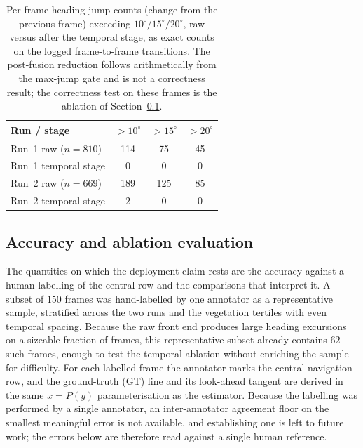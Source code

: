 {\renewcommand{\arraystretch}{1.2}
\begin{table}[!ht]
  \centering
  \caption{Per-frame heading-jump counts (change from the previous frame)
    exceeding $10^\circ/15^\circ/20^\circ$, raw versus after the temporal stage,
    as exact counts on the logged frame-to-frame transitions. The post-fusion
    reduction follows arithmetically from the max-jump gate and is not a
    correctness result; the correctness test on these frames is the ablation of
    Section~\ref{sec:res-accuracy}.}
  \label{tab:res-temporal}
  \begin{tabular}{lccc}
    \hline
    \textbf{Run / stage} & \textbf{$>10^\circ$} & \textbf{$>15^\circ$} & \textbf{$>20^\circ$} \\
    \hline
    Run~1 raw ($n=810$)   & 114 & 75 & 45 \\
    Run~1 temporal stage   & 0   & 0   & 0  \\
    \hline
    Run~2 raw ($n=669$)    & 189 & 125 & 85 \\
    Run~2 temporal stage   & 2   & 0   & 0  \\
    \hline
  \end{tabular}
\end{table}}

\subsection{Accuracy and ablation evaluation}
\label{sec:res-accuracy}
\label{sec:res-baselines}

The quantities on which the deployment claim rests are the accuracy against a
human labelling of the central row and the comparisons that interpret it. A subset
of $150$ frames was hand-labelled by one annotator as a representative sample,
stratified across the two runs and the vegetation tertiles with even temporal
spacing. Because the raw front end produces large heading excursions on a sizeable
fraction of frames, this representative subset already contains $62$ such frames,
enough to test the temporal ablation without enriching the sample for difficulty. For
each labelled frame the annotator marks the central navigation row, and the
ground-truth (GT) line and its look-ahead tangent are derived in the same
$x=P(y)$ parameterisation as the estimator. Because the labelling was performed by
a single annotator, an inter-annotator agreement floor on the smallest meaningful
error is not available, and establishing one is left to future work; the errors
below are therefore read against a single human reference.

